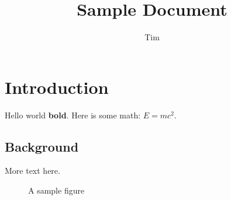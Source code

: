 \documentclass{article}
\title{Sample Document}
\author{Tim}
\begin{document}
\section{Introduction}
Hello world \textbf{bold}. Here is some math: $E = mc^2$.

\subsection{Background}
More text here.

\begin{figure}[h]
\caption{A sample figure}
\end{figure}

\newcommand{\mycmd}[1]{Custom: #1}
\end{document}
